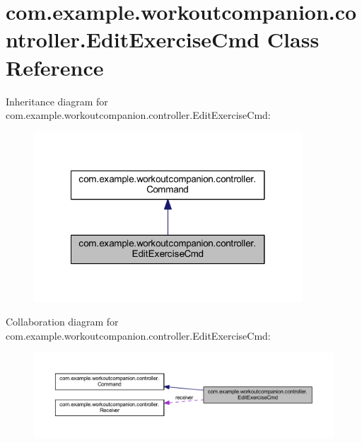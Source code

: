 \hypertarget{classcom_1_1example_1_1workoutcompanion_1_1controller_1_1_edit_exercise_cmd}{\section{com.\-example.\-workoutcompanion.\-controller.\-Edit\-Exercise\-Cmd Class Reference}
\label{classcom_1_1example_1_1workoutcompanion_1_1controller_1_1_edit_exercise_cmd}
}


Inheritance diagram for com.\-example.\-workoutcompanion.\-controller.\-Edit\-Exercise\-Cmd\-:\nopagebreak
\begin{figure}[H]
\begin{center}
\leavevmode
\includegraphics[width=284pt]{classcom_1_1example_1_1workoutcompanion_1_1controller_1_1_edit_exercise_cmd__inherit__graph}
\end{center}
\end{figure}


Collaboration diagram for com.\-example.\-workoutcompanion.\-controller.\-Edit\-Exercise\-Cmd\-:\nopagebreak
\begin{figure}[H]
\begin{center}
\leavevmode
\includegraphics[width=350pt]{classcom_1_1example_1_1workoutcompanion_1_1controller_1_1_edit_exercise_cmd__coll__graph}
\end{center}
\end{figure}
